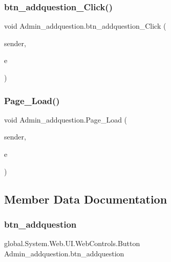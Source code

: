 \subsubsection{\texorpdfstring{btn\_addquestion\_Click()}{btn\_addquestion\_Click()}}
{\footnotesize\ttfamily void Admin\+\_\+addquestion.\+btn\+\_\+addquestion\+\_\+\+Click (\begin{DoxyParamCaption}\item[{object}]{sender,  }\item[{Event\+Args}]{e }\end{DoxyParamCaption})\hspace{0.3cm}{\ttfamily [protected]}}

\mbox{\label{class_admin__addquestion_aebc27b7679568fb4a4f966a8a40f7363}} 
\subsubsection{\texorpdfstring{Page\_Load()}{Page\_Load()}}
{\footnotesize\ttfamily void Admin\+\_\+addquestion.\+Page\+\_\+\+Load (\begin{DoxyParamCaption}\item[{object}]{sender,  }\item[{Event\+Args}]{e }\end{DoxyParamCaption})\hspace{0.3cm}{\ttfamily [protected]}}



\subsection{Member Data Documentation}
\mbox{\label{class_admin__addquestion_ab3d0580e5cafa60731a14bb68962dfc9}} 
\subsubsection{\texorpdfstring{btn\_addquestion}{btn\_addquestion}}
{\footnotesize\ttfamily global.\+System.\+Web.\+U\+I.\+Web\+Controls.\+Button Admin\+\_\+addquestion.\+btn\+\_\+addquestion\hspace{0.3cm}{\ttfamily [protected]}}



